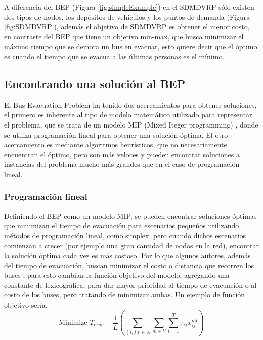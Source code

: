 \documentclass[letter, 10pt]{article}
\begin{document}
A diferencia del BEP (Figura \ref{fig:simpleExample}) en el SDMDVRP sólo existen dos tipos de nodos, los depósitos de vehículos y los puntos de demanda (Figura \ref{fig:SDMDVRP}), además el objetivo de SDMDVRP es obtener el menor costo, en contraste del BEP que tiene un objetivo min-max, que busca minimizar el máximo tiempo que se demora un bus en evacuar, esto quiere decir que el óptimo es cuando el tiempo que se evacua a las últimas personas es el mínimo.

\newpage
\subsection{Encontrando una solución al BEP}

El Bus Evacuation Problem ha tenido dos acercamientos para obtener soluciones, el primero es inherente al tipo de modelo matemático utilizado para representar el problema, que se trata de un modelo MIP (Mixed Iteger programming) \cite{bish2011planning,goerigk2012robust,goerigk2013two}, donde se utiliza programación lineal para obtener una solución óptima. El otro acercamiento es mediante algoritmos heurísticos, que no necesariamente encuentran el óptimo, pero son más veloces y pueden encontrar soluciones a instancias del problema mucho más grandes que en el caso de programación lineal.

\subsubsection{Programación lineal}

Definiendo el BEP como un modelo MIP, se pueden encontrar soluciones óptimas que minimizan el tiempo de evacuación para escenarios pequeños utilizando métodos de programación lineal, como simplex; pero cuando dichos escenarios comienzan a crecer (por ejemplo una gran cantidad de nodos en la red), encontrar la solución óptima cada vez es más costoso. Por lo que algunos autores, además del tiempo de evacuación, buscan minimizar el costo o distancia que recorren los buses \cite{bish2011planning}, para esto cambian la función objetivo del modelo, agregando una constante de lexicográfica, para dar mayor prioridad al tiempo de evacuación o al costo de los buses, pero tratando de minimizar ambas. Un ejemplo de función objetivo sería.
\begin{equation*}
  \text {Minimize }T_{evac} + \frac{1}{L} \left( \sum_{(i,j) \in A} \sum_{m \in V} \sum_{t = 1}^T \tau_{ij} x_{ij}^{mt} \right)
\end{equation*}
\end{document}

